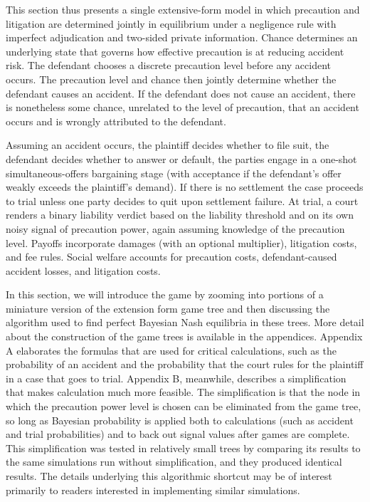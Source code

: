 \documentclass{article}
\begin{document}
This section thus presents a single extensive-form model in which precaution and litigation are determined jointly in equilibrium under a negligence rule with imperfect adjudication and two-sided private information. Chance determines an underlying state that governs how effective precaution is at reducing accident risk. The defendant chooses a discrete precaution level before any accident occurs. The precaution level and chance then jointly determine whether the defendant causes an accident. If the defendant does not cause an accident, there is nonetheless some chance, unrelated to the level of precaution, that an accident occurs and is wrongly attributed to the defendant. 

Assuming an accident occurs, the plaintiff decides whether to file suit, the defendant decides whether to answer or default, the parties engage in a one-shot simultaneous-offers bargaining stage (with acceptance if the defendant’s offer weakly exceeds the plaintiff’s demand). If there is no settlement the case proceeds to trial unless one party decides to quit upon settlement failure. At trial, a court renders a binary liability verdict based on the liability threshold and on its own noisy signal of precaution power, again assuming knowledge of the precaution level. Payoffs incorporate damages (with an optional multiplier), litigation costs, and fee rules. Social welfare accounts for precaution costs, defendant-caused accident losses, and litigation costs. 

In this section, we will introduce the game by zooming into portions of a miniature version of the extension form game tree and then discussing the algorithm used to find perfect Bayesian Nash equilibria in these trees. More detail about the construction of the game trees is available in the appendices. Appendix A elaborates the formulas that are used for critical calculations, such as the probability of an accident and the probability that the court rules for the plaintiff in a case that goes to trial. Appendix B, meanwhile, describes a simplification that makes calculation much more feasible. The simplification is that the node in which the precaution power level is chosen can be eliminated from the game tree, so long as Bayesian probability is applied both to calculations (such as accident and trial probabilities) and to back out signal values after games are complete. This simplification was tested in relatively small trees by comparing its results to the same simulations run without simplification, and they produced identical results. The details underlying this algorithmic shortcut may be of interest primarily to readers interested in implementing similar simulations.
\end{document}
